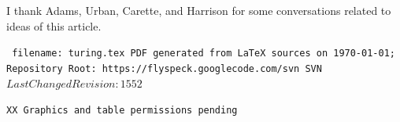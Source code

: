 \documentclass{llncs}
\def\svninfo{{\tt
  filename: turing.tex\hfill\break
  PDF generated from LaTeX sources on \today; \hfill\break
  Repository Root: https://flyspeck.googlecode.com/svn \hfill\break
  SVN $LastChangedRevision: 1552 $
  }
  }
\def\endnote{{\tt   XX Graphics and table permissions pending}}
\begin{document}
\bigskip

I thank Adams, Urban, Carette, and Harrison for some conversations
related to ideas of this article.


\raggedright



\bigskip
\noindent
\svninfo
\smallskip

\noindent
\endnote
\end{document}

